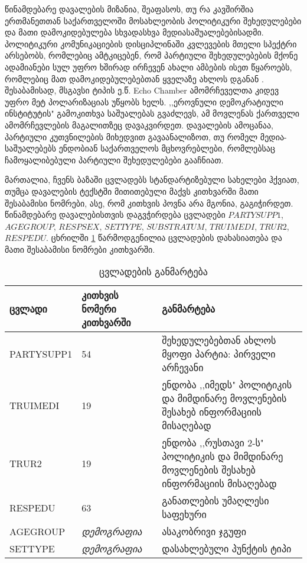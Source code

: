 \documentclass{article}\usepackage[]{graphicx}\usepackage[]{color}
\begin{document}
წინამდებარე დავალების მიზანია, შეაფასოს, თუ რა კავშირშია ერთმანეთთან საქართველოში მოსახლეობის პოლიტიკური შეხედულებები და მათი დამოკიდებულება სხვადასხვა მედიასაშუალებებისადმი. პოლიტიკური კომუნიკაციების დისციპლინაში კვლევების მთელი სპექტრი არსებობს, რომლებიც ამტკიცებენ, რომ პარტიული შეხედულებების მქონე ადამიანები სულ უფრო ხშირად ირჩევენ ახალი ამბების ისეთ წყაროებს, რომლებიც მათ დამოკიდებულებებთან ყველაზე ახლოს დგანან \cite{levendusky_partisan_2017} \cite{boxell_is_2017} \cite{levendusky_does_2016} \cite{stroud_media_2008}
 \cite{stroud_polarization_2010}. შესაბამისად, მსგავსი ტიპის ე.წ. Echo Chamber ამომრჩეველთა კიდევ უფრო მეტ პოლარიზაციას უწყობს ხელს. ,,ეროვნული დემოკრატიული ინსტიტუტის" გამოკითხვა საშუალებას გვაძლევს, ამ მოვლენას ქართველი ამომრჩევლების მაგალითზეც დავაკვირდეთ. დავალების ამოცანაა, პარტიული კუთვნილების მიხედვით გავაანალიზოთ, თუ რომელ მედია-საშუალებებს ენდობიან საქართველოს მცხოვრებლები, რომლებსაც ჩამოყალიბებული პარტიული შეხედულებები გააჩნიათ.

მართალია, ჩვენს ბაზაში ცვლადებს სტანდარტიზებული სახელები ჰქვიათ, თუმცა დავალების ტექსტში მითითებული მაქვს კითხვარში მათი შესაბამისი ნომრები, ასე, რომ კითხვის პოვნა არა მგონია, გაგიჭირდეთ. წინამდებარე დავალებისთვის დაგვჭირდება ცვლადები $PARTYSUPP1$, $AGEGROUP$, $RESPSEX$, $SETTYPE$, $SUBSTRATUM$, $TRUIMEDI$, $TRUR2$, $RESPEDU$. ცხრილში \ref{tabledef} წარმოდგენილია ცვლადების დახასიათება და მათი შესაბამისი ნომრები კითხვარში.

\begin{table}[]
\centering
\caption{ცვლადების განმარტება}
\label{tabledef}
\begin{tabular}{@{}lll@{}}
\toprule
ცვლადი     & კითხვის ნომერი კითხვარში & განმარტება                                                                            \\ \midrule
PARTYSUPP1 & 54                       & \begin{minipage}{2in}{შეხედულებებთან ახლოს მყოფი პარტია: პირველი არჩევანი}\end{minipage}                                 \\
TRUIMEDI   & 19                       & \begin{minipage}{2in}ენდობა ,,იმედს" პოლიტიკის და მიმდინარე მოვლენების შესახებ ინფორმაციის მისაღებად\end{minipage}       \\
TRUR2      & 19                       & \begin{minipage}{2in}ენდობა ,,რუსთავი 2-ს" პოლიტიკის და მიმდინარე მოვლენების შესახებ ინფორმაციის მისაღებად\end{minipage} \\
RESPEDU    & 63                       & განათლების უმაღლესი საფეხური                                                          \\
AGEGROUP   & \emph{დემოგრაფია}      & ასაკობრივი ჯგუფი                                                                      \\
SETTYPE    & \emph{დემოგრაფია}      & დასახლებული პუნქტის ტიპი                                                              \\ \bottomrule
\end{tabular}
\end{table}
\end{document}
